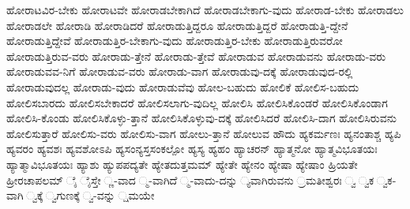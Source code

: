 {ಹೋರಾಟವಿರ-ಬೇಕು
ಹೋರಾಟವೇ
ಹೋರಾಡಬೇಕಾಗಿದೆ
ಹೋರಾಡಬೇಕಾಗು-ವುದು
ಹೋರಾಡ-ಬೇಕು
ಹೋರಾಡಲು
ಹೋರಾಡಲೇ
ಹೋರಾಡಿ
ಹೋರಾಡಿದರೆ
ಹೋರಾಡುತ್ತಿದ್ದರೂ
ಹೋರಾಡುತ್ತಿದ್ದರೆ
ಹೋರಾಡುತ್ತಿ-ದ್ದೇನೆ
ಹೋರಾಡುತ್ತಿದ್ದೇವೆ
ಹೋರಾಡುತ್ತಿರ-ಬೇಕಾಗು-ವುದು
ಹೋರಾಡುತ್ತಿರ-ಬೇಕು
ಹೋರಾಡುತ್ತಿರುವರೋ
ಹೋರಾಡುತ್ತಿರುವ-ವರು
ಹೋರಾಡು-ತ್ತೇನೆ
ಹೋರಾಡು-ತ್ತೇವೆ
ಹೋರಾಡುವ
ಹೋರಾಡುವನು
ಹೋರಾಡು-ವರು
ಹೋರಾಡುವವ-ನಿಗೆ
ಹೋರಾಡುವ-ವರು
ಹೋರಾಡು-ವಾಗ
ಹೋರಾಡುವು-ದಕ್ಕೆ
ಹೋರಾಡುವುದ-ರಲ್ಲಿ
ಹೋರಾಡುವುದಲ್ಲ
ಹೋರಾಡು-ವುದು
ಹೋರಾಡುವೆವು
ಹೋಲ-ಬಹುದು
ಹೋಲಿಕೆ
ಹೋಲಿಸ-ಬಹುದು
ಹೋಲಿಸಬಾರದು
ಹೋಲಿಸಬೇಕಾದರೆ
ಹೋಲಿಸಲಾಗು-ವುದಿಲ್ಲ
ಹೋಲಿಸಿ
ಹೋಲಿಸಿಕೊಂಡರೆ
ಹೋಲಿಸಿಕೊಂಡಾಗ
ಹೋಲಿಸಿ-ಕೊಂಡು
ಹೋಲಿಸಿಕೊಳ್ಳು-ತ್ತಾನೆ
ಹೋಲಿಸಿಕೊಳ್ಳುವು-ದಕ್ಕೆ
ಹೋಲಿಸಿದರೆ
ಹೋಲಿಸಿ-ದಾಗ
ಹೋಲಿಸಿರುವನು
ಹೋಲಿಸುತ್ತಾರೆ
ಹೋಲಿಸು-ವರು
ಹೋಲಿಸು-ವಾಗ
ಹೋಲು-ತ್ತಾನೆ
ಹೋಲುವ
ಹೌದು
ಹ್ಯಕರ್ಮಣಃ
ಹ್ಯನಂತಾಶ್ಚ
ಹ್ಯಪಿ
ಹ್ಯವರಂ
ಹ್ಯವಶಃ
ಹ್ಯವಶೋಽಪಿ
ಹ್ಯಸಂನ್ಯಸ್ತಸಂಕಲ್ಪೋ
ಹ್ಯಸ್ಯ
ಹ್ಯಹಂ
ಹ್ಯಾಚರನ್
ಹ್ಯಾತ್ಮನೋ
ಹ್ಯಾತ್ಮವಿಭೂತಯಃ
ಹ್ಯಾತ್ಮಾವಿಭೂತಯಃ
ಹ್ಯಾಶು
ಹ್ಯುಪಪದ್ಯತೇ
ಹ್ಯೇತದುತ್ತಮಮ್
ಹ್ಯೇತೇ
ಹ್ಯೇನಂ
ಹ್ಯೇಷಾ
ಹ್ಯೇಷಾಂ
ಹ್ರಿಯತೇ
ಹ್ರೀರಚಾಪಲಮ್
ೈ
ೈಸ್ತೇ
್ಣ-ವಾದ
್ಮ-ವಾಗಿದೆ
್ಮ-ವಾದು-ದನ್ನು
್ಯವಾಗಿರುವನು
್ರಮತೀಶ್ವರಃ
್ವ
್ವಕ
್ವಕ-ವಾಗಿ
್ವಕ್ಕೆ
್ವಗುಣಕ್ಕೆ
್ವ-ವನ್ನು
್ಷಮಯೇ
}
